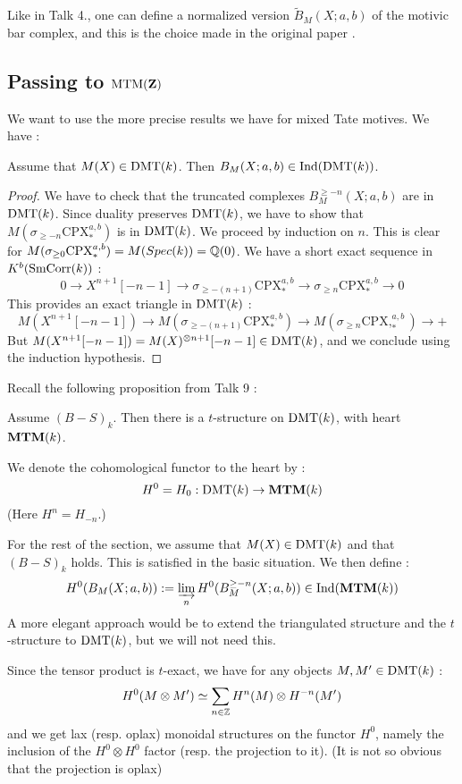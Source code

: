 Like in Talk 4., one can define a normalized version $\tilde{B}_M(X;a,b)$ of the motivic bar complex, and this is the choice made in the original paper \cite{deligne-goncharov05}.

\subsection{Passing to $\mathrm{MTM}(\mathbf{Z})$}

We want to use the more precise results we have for mixed Tate motives. We have :

\begin{prop}
 Assume that $M(X)\in \mathrm{DMT}(k)$. Then $B_M(X;a,b) \in \mathrm{Ind}(\mathrm{DMT}(k))$.
\end{prop}
\begin{proof}
We have to check that the truncated complexes $B_M^{\geq -n}(X;a,b)$ are in $\mathrm{DMT}(k)$. Since duality preserves $\mathrm{DMT}(k)$, we have to show that $M(\sigma_{\geq -n}\mathrm{CPX}^{a,b}_*)$ is in $\mathrm{DMT}(k)$. We proceed by induction on $n$. This is clear for $M(\sigma_{\geq 0}\mathrm{CPX}^{a,b}_*)=M(Spec(k))=\mathbb{Q}(0)$. We have a short exact sequence in $K^b(\mathrm{SmCorr}(k))$ :
\[
0\rightarrow X^{n+1}[-n-1]\rightarrow \sigma_{\geq -(n+1)}\mathrm{CPX}^{a,b}_*\rightarrow \sigma_{\geq n}\mathrm{CPX}^{a,b}_*\rightarrow 0
\]
This provides an exact triangle in $\mathrm{DMT}(k)$ :
\[
M(X^{n+1}[-n-1])\rightarrow M(\sigma_{\geq -(n+1)}\mathrm{CPX}^{a,b}_*)\rightarrow M(\sigma_{\geq n}\mathrm{CPX},^{a,b}_*)\rightarrow +
\]
 But $M(X^{n+1}[-n-1])=M(X)^{\otimes n+1}[-n-1]\in \mathrm{DMT}(k)$, and we conclude using the induction hypothesis.
\end{proof}

Recall the following proposition from Talk 9 :

\begin{prop}
Assume $(B-S)_k$. Then there is a $t$-structure on $\mathrm{DMT}(k)$, with heart $\mathbf{MTM}(k)$.
\end{prop}

We denote the cohomological functor to the heart by :
\[
H^0 = H_0 : \mathrm{DMT}(k) \to \mathbf{MTM}(k)
\]
(Here $H^n = H_{-n}$.)

For the rest of the section, we assume that $M(X)\in \mathrm{DMT}(k)$ and that $(B-S)_k$ holds. This is satisfied in the basic situation. We then define :
\[
H^0(B_M(X;a,b)):=\varinjlim_{n}H^0(B_M^{\geq -n}(X;a,b))\in\mathrm{Ind}(\mathbf{MTM}(k))
\]
A more elegant approach would be to extend the triangulated structure and the $t$-structure to $\mathrm{DMT}(k)$, but we will not need this.

Since the tensor product is $t$-exact, we have for any objects $M,M'\in \mathrm{DMT}(k)$ :
\[
H^0(M\otimes M')\simeq \sum_{n\in\mathbb{Z}}H^n(M)\otimes H^{-n}(M')
\]
and we get lax (resp. oplax) monoidal structures on the functor $H^0$, namely the inclusion of the $H^0\otimes H^0$ factor (resp. the projection to it). (It is not so obvious that the projection is oplax)


